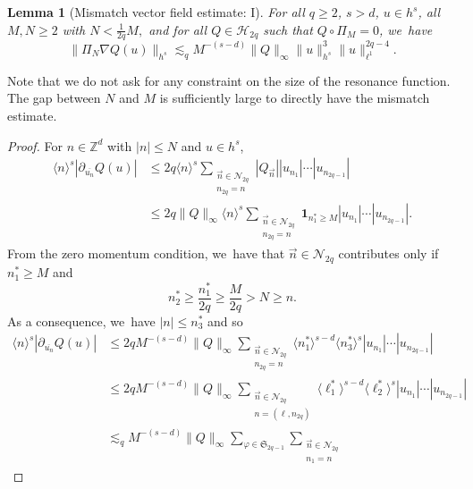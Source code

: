 \documentclass[JEP,XML,SOM,Unicode,published]{cedram}
\theoremstyle{plain}
\newtheorem{lemma}[theorem]{Lemma}
\theoremstyle{definition}
\newcommand{\1}{\mathbf{1}}
\begin{document}
\begin{lemma}[Mismatch vector field estimate: I]\label{lem:misI}
For all $q\geq 2$, $s>d$, $u\in h^s$, all $M,N\geq 2$ with
$N<\frac{1}{2q}M, $
and for all $Q\in\mathcal{H}_{2q}$ such that $Q\circ \Pi_M = 0$, we~have
\begin{equation*}
\|\Pi_{N} \nabla Q(u)\|_{h^{s}} \lesssim_{q} M^{-(s-d)}
\|Q\|_{\infty}
\|u\|_{h^{s}}^{3}\|u\|_{\ell^{1}}^{2q-4}.
\end{equation*}
\end{lemma}
Note that we do not ask for any constraint on the size of the resonance function. The gap between $N$ and $M$ is sufficiently large to directly have the mismatch estimate.
\begin{proof}
For $n\in \mathbb{Z}^d$ with $|n|\leq N$ and $u\in h^{s}$,
\begin{equation*}
\begin{split}
\langle n\rangle^{s}| \partial_{\overline{u_n}} Q(u)|& \leq 2q \langle n\rangle^{s}
\sum_{\substack{\vec{n}\in\mathcal{N}_{2q}\\ n_{2q}=n}} |Q_{\vec{n}}||u_{n_{1}}|\cdots|u_{n_{2q-1}}| \\
&\leq 2q\|Q\|_{\infty} \langle n\rangle^{s}\sum_{\substack{\vec{n}\in\mathcal{N}_{2q}\\n_{2q}=n}} \mathbf{1}_{n_{1}^{\ast}\geq M}|u_{n_{1}}|\cdots|u_{n_{2q-1}}|.
\end{split}
\end{equation*}
From the zero momentum condition, we~have that $\vec{n}\in\mathcal{N}_{2q}$ contributes only if $n_{1}^{\ast}\geq M$ and
\[
n_{2}^{\ast}\geq \frac{n_{1}^{\ast}}{2q} \geq \frac{M}{2q} > N \geq n.
\]
As a consequence, we~have $|n|\leq n_{3}^{\ast}$ and so
\begin{equation*}
\begin{split}
\langle n\rangle^{s}|\partial_{\overline{u_n}} Q(u)| &\leq 2q M^{-(s-d)} \|Q\|_{\infty}
\sum_{\substack{\vec{n}\in\mathcal{N}_{2q}\\n_{2q}=n}}
\langle n_{1}^{\ast}\rangle^{s-d} \langle n_{3}^{\ast}\rangle^{s}
|u_{n_{1}}|\cdots|u_{n_{2q-1}}|\\
&\leq 2q M^{-(s-d)} \|Q\|_{\infty}
\sum_{\substack{\vec{n}\in\mathcal{N}_{2q} \\ n=(\ell,n_{2q})}}
\langle \ell_{1}^{\ast}\rangle^{s-d} \langle \ell_{2}^{\ast}\rangle^{s}
|u_{n_{1}}|\cdots|u_{n_{2q-1}}|\\
&\lesssim_q M^{-(s-d)} \|Q\|_{\infty}
\sum_{\varphi \in \mathfrak{S}_{2q-1}}\sum_{\substack{\vec{n}\in\mathcal{N}_{2q}\\n_{1}=n}}

\end{split}
\end{equation*}
\end{proof}
\end{document}
